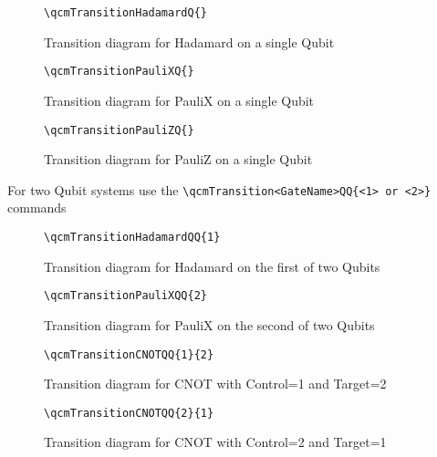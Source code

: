 \documentclass{article}
\begin{document}
\begin{figure}[!ht]
    \begin{verbatim}
\qcmTransitionHadamardQ{}
    \end{verbatim}
    \centering
    \qcmTransitionHadamardQ{}
    \caption{Transition diagram for Hadamard on a single Qubit}
\end{figure}

\begin{figure}[!ht]
    \begin{verbatim}
\qcmTransitionPauliXQ{}
    \end{verbatim}
    \centering
    \qcmTransitionPauliXQ{}
    \caption{Transition diagram for PauliX on a single Qubit}
\end{figure}

\begin{figure}[!ht]
    \begin{verbatim}
\qcmTransitionPauliZQ{}
    \end{verbatim}
    \centering
    \qcmTransitionPauliZQ{}
    \caption{Transition diagram for PauliZ on a single Qubit}
\end{figure}

For two Qubit systems use the \verb|\qcmTransition<GateName>QQ{<1> or <2>}| commands
\begin{figure}[!ht]
    \begin{verbatim}
\qcmTransitionHadamardQQ{1}
    \end{verbatim}
    \centering
    \caption{Transition diagram for Hadamard on the first of two Qubits}
\end{figure}

\begin{figure}[!ht]
    \begin{verbatim}
\qcmTransitionPauliXQQ{2}
    \end{verbatim}
    \centering
    \caption{Transition diagram for PauliX on the second of two Qubits}
\end{figure}

\begin{figure}[!ht]
    \begin{verbatim}
\qcmTransitionCNOTQQ{1}{2}
    \end{verbatim}
    \centering
    \caption{Transition diagram for CNOT with Control=1 and Target=2}
\end{figure}

\begin{figure}[!ht]
    \begin{verbatim}
\qcmTransitionCNOTQQ{2}{1}
    \end{verbatim}
    \centering
    \caption{Transition diagram for CNOT with Control=2 and Target=1}
\end{figure}
\end{document}
